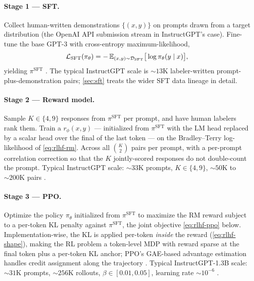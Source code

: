 \paragraph{Stage 1 — SFT.} Collect human-written demonstrations
$\{(x, y)\}$ on prompts drawn from a target distribution (the OpenAI
API submission stream in InstructGPT's case). Fine-tune the base GPT-3
with cross-entropy maximum-likelihood,
\begin{equation}
\mathcal{L}_{\mathrm{SFT}}(\pi_\theta)
  = -\operatorname{\mathbb{E}}_{(x,y)\sim\mathcal{D}_{\mathrm{SFT}}}\!\big[\log \pi_\theta(y \mid x)\big],
\label{eq:rlhf-sft}
\end{equation}
yielding $\pi^{\mathrm{SFT}}$ \citep[\S 3]{ouyang2022-instructgpt}. The
typical InstructGPT scale is $\sim\!13$K labeler-written
prompt-plus-demonstration pairs; \cref{sec:sft} treats the wider SFT
data lineage in detail.

\paragraph{Stage 2 — Reward model.} Sample $K \in \{4, 9\}$ responses
from $\pi^{\mathrm{SFT}}$ per prompt, and have human labelers rank
them. Train a  $r_\phi(x, y)$ — initialized from
$\pi^{\mathrm{SFT}}$ with the LM head replaced by a scalar head over
the final  of the last token — on the Bradley--Terry
log-likelihood of \cref{eq:rlhf-rm}. Across all $\binom{K}{2}$ pairs
per prompt, with a per-prompt correlation correction so that the
$K$ jointly-scored responses do not double-count the prompt. Typical
InstructGPT scale: $\sim\!33$K prompts, $K \in \{4,9\}$, $\sim\!50$K
to $\sim\!200$K pairs \citep[\S 3]{ouyang2022-instructgpt}.

\paragraph{Stage 3 — PPO.} Optimize the policy $\pi_\theta$
initialized from $\pi^{\mathrm{SFT}}$ to maximize the RM reward subject
to a per-token KL penalty against $\pi^{\mathrm{SFT}}$, the joint
objective \cref{eq:rlhf-ppo} below. Implementation-wise, the KL is
applied per-token \emph{inside} the reward (\cref{eq:rlhf-shape}),
making the RL problem a token-level MDP with reward sparse at the
final token plus a per-token KL anchor; PPO's GAE-based advantage
estimation handles credit assignment along the trajectory
\citep{schulman2017-ppo}. Typical InstructGPT-1.3B scale: $\sim\!31$K
prompts, $\sim\!256$K rollouts, $\beta \in [0.01, 0.05]$, learning
rate $\sim\!10^{-6}$ \citep[\S 3]{ouyang2022-instructgpt}.


